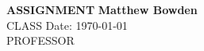 \documentclass[letterpaper, 11pt]{article}
\begin{document}
\noindent
\large\textbf{ASSIGNMENT} \hfill \textbf{Matthew Bowden} \\
\normalsize CLASS \hfill Date: \today \\
PROFESSOR

\end{document}
